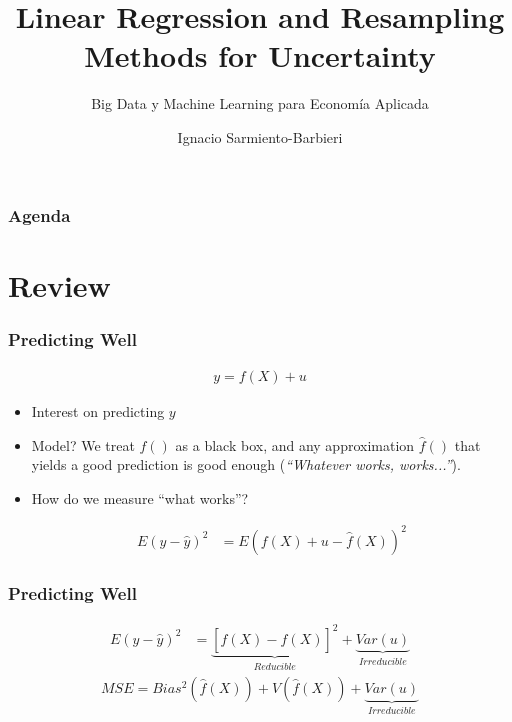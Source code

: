 \documentclass[
  shownotes,
  xcolor={svgnames},
  hyperref={colorlinks,citecolor=DarkBlue,linkcolor=andesred,urlcolor=DarkBlue}
  , aspectratio=169]{beamer}
\begin{document}
\title{Linear Regression and Resampling Methods for Uncertainty}
\subtitle{Big Data y Machine Learning para Economía Aplicada}
\date{}

\author[Sarmiento-Barbieri]{Ignacio Sarmiento-Barbieri}


\begin{frame}[noframenumbering]
\maketitle
\end{frame}


\begin{frame}
\frametitle{Agenda}

\tableofcontents


\end{frame}
\section{Review}
\begin{frame}
\frametitle{Predicting Well}


\begin{align}
y=f(X)+u
\end{align}

\begin{itemize}
  \item Interest on predicting $y$
  \medskip
  \item Model? We  treat $f()$ as a black box, and any approximation $\hat{f}()$ that yields a good prediction is good enough ({\it ``Whatever works, works...''}).
  \medskip
  \item How do we measure ``what works''?
  
  \medskip
  \begin{align}
E(y-\hat y)^2 &= E(f(X)+u - \hat f(X))^2 
\end{align}

\end{itemize}
\end{frame}
\begin{frame}
\frametitle{Predicting Well}

\begin{align}
E(y-\hat y)^2  &= \underset{Reducible}{\underbrace{[f(X)-\hat{f}(X)]^{2}}}+\underset{Irreducible}{\underbrace{Var(u)}}
\end{align}
\begin{align}
  MSE = Bias^2 (\hat f(X))+V (\hat f(X)) +\underset{Irreducible}{\underbrace{Var(u)}}
\end{align}
\end{frame}
\end{document}
